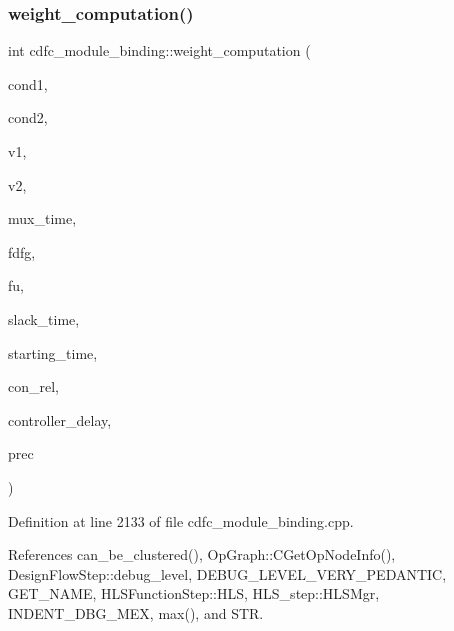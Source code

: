 \subsubsection{\texorpdfstring{weight\+\_\+computation()}{weight\_computation()}}
{\footnotesize\ttfamily int cdfc\+\_\+module\+\_\+binding\+::weight\+\_\+computation (\begin{DoxyParamCaption}\item[{bool}]{cond1,  }\item[{bool}]{cond2,  }\item[{\hyperlink{graph_8hpp_abefdcf0544e601805af44eca032cca14}{vertex}}]{v1,  }\item[{\hyperlink{graph_8hpp_abefdcf0544e601805af44eca032cca14}{vertex}}]{v2,  }\item[{const double}]{mux\+\_\+time,  }\item[{const \hyperlink{op__graph_8hpp_a9a0b240622c47584bee6951a6f5de746}{Op\+Graph\+Const\+Ref}}]{fdfg,  }\item[{const \hyperlink{fu__binding_8hpp_a61ca2120cd9d7839a550557a05fa776d}{fu\+\_\+binding\+Const\+Ref}}]{fu,  }\item[{const \hyperlink{custom__map_8hpp_ad1ed68f2ff093683ab1a33522b144adc}{Custom\+Unordered\+Map}$<$ \hyperlink{graph_8hpp_abefdcf0544e601805af44eca032cca14}{vertex}, double $>$ \&}]{slack\+\_\+time,  }\item[{\hyperlink{custom__map_8hpp_ad1ed68f2ff093683ab1a33522b144adc}{Custom\+Unordered\+Map}$<$ \hyperlink{graph_8hpp_abefdcf0544e601805af44eca032cca14}{vertex}, double $>$ \&}]{starting\+\_\+time,  }\item[{\hyperlink{cdfc__module__binding_8hpp_add937cbd74df34342adc0bb9231809a8}{connection\+\_\+relation} \&}]{con\+\_\+rel,  }\item[{double}]{controller\+\_\+delay,  }\item[{unsigned int}]{prec }\end{DoxyParamCaption})\hspace{0.3cm}{\ttfamily [protected]}}



Definition at line 2133 of file cdfc\+\_\+module\+\_\+binding.\+cpp.



References can\+\_\+be\+\_\+clustered(), Op\+Graph\+::\+C\+Get\+Op\+Node\+Info(), Design\+Flow\+Step\+::debug\+\_\+level, D\+E\+B\+U\+G\+\_\+\+L\+E\+V\+E\+L\+\_\+\+V\+E\+R\+Y\+\_\+\+P\+E\+D\+A\+N\+T\+IC, G\+E\+T\+\_\+\+N\+A\+ME, H\+L\+S\+Function\+Step\+::\+H\+LS, H\+L\+S\+\_\+step\+::\+H\+L\+S\+Mgr, I\+N\+D\+E\+N\+T\+\_\+\+D\+B\+G\+\_\+\+M\+EX, max(), and S\+TR.



